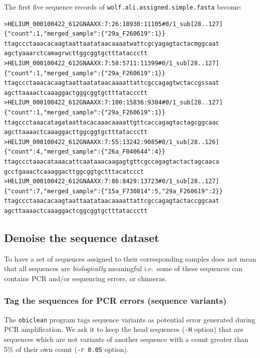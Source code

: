 \documentclass[
  letterpaper,
  DIV=11,
  numbers=noendperiod]{scrreprt}
\begin{document}
The first five sequence records of
\texttt{wolf.ali.assigned.simple.fasta} become:

\begin{verbatim}
>HELIUM_000100422_612GNAAXX:7:26:18930:11105#0/1_sub[28..127] {"count":1,"merged_sample":{"29a_F260619":1}}
ttagccctaaacacaagtaattaatataacaaaatwattcgcyagagtactacmggcaat
agctyaaarctcamagrwcttggcggtgctttataccctt
>HELIUM_000100422_612GNAAXX:7:58:5711:11399#0/1_sub[28..127] {"count":1,"merged_sample":{"29a_F260619":1}}
ttagccctaaacacaagtaattaatataacaaaattattcgccagagtwctaccgssaat
agcttaaaactcaaaggactgggcggtgctttataccctt
>HELIUM_000100422_612GNAAXX:7:100:15836:9304#0/1_sub[28..127] {"count":1,"merged_sample":{"29a_F260619":1}}
ttagccctaaacatagataattacacaaacaaaattgttcaccagagtactagcggcaac
agcttaaaactcaaaggacttggcggtgctttataccctt
>HELIUM_000100422_612GNAAXX:7:55:13242:9085#0/1_sub[28..126] {"count":4,"merged_sample":{"26a_F040644":4}}
ttagccctaaacataaacattcaataaacaagagtgttcgccagagtactactagcaaca
gcctgaaactcaaaggacttggcggtgctttacatccct
>HELIUM_000100422_612GNAAXX:7:86:8429:13723#0/1_sub[28..127] {"count":7,"merged_sample":{"15a_F730814":5,"29a_F260619":2}}
ttagccctaaacacaagtaattaatataacaaaattattcgccagagtactaccggcaat
agcttaaaactcaaaggactcggcggtgctttataccctt
\end{verbatim}

\hypertarget{denoise-the-sequence-dataset}{%
\subsection{Denoise the sequence
dataset}\label{denoise-the-sequence-dataset}}

To have a set of sequences assigned to their corresponding samples does
not mean that all sequences are \emph{biologically} meaningful i.e.~some
of these sequences can contains PCR and/or sequencing errors, or
chimeras.

\hypertarget{tag-the-sequences-for-pcr-errors-sequence-variants}{%
\subsubsection*{Tag the sequences for PCR errors (sequence
variants)}\label{tag-the-sequences-for-pcr-errors-sequence-variants}}

The \texttt{obiclean} program tags sequence variants as potential error
generated during PCR amplification. We ask it to keep the {head}
sequences (\texttt{-H} option) that are sequences which are not variants
of another sequence with a count greater than 5\% of their own count
(\texttt{-r\ 0.05} option).
\end{document}
